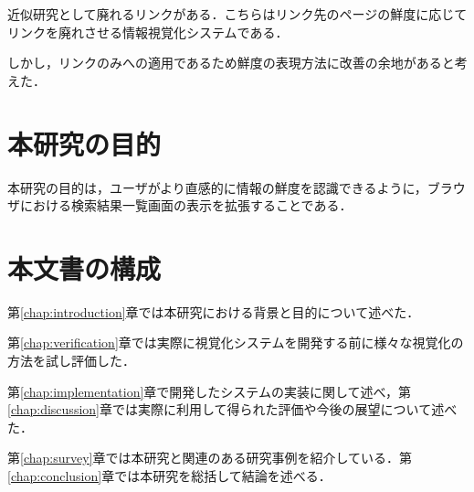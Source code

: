近似研究として廃れるリンク\cite{dyinglink}がある．こちらはリンク先のページの鮮度に応じてリンクを廃れさせる情報視覚化システムである．

しかし，リンクのみへの適用であるため鮮度の表現方法に改善の余地があると考えた．

\section{本研究の目的}

本研究の目的は，ユーザがより直感的に情報の鮮度を認識できるように，ブラウザにおける検索結果一覧画面の表示を拡張することである．

\section{本文書の構成}

第\ref{chap:introduction}章では本研究における背景と目的について述べた．

第\ref{chap:verification}章では実際に視覚化システムを開発する前に様々な視覚化の方法を試し評価した．

第\ref{chap:implementation}章で開発したシステムの実装に関して述べ，第\ref{chap:discussion}章では実際に利用して得られた評価や今後の展望について述べた．

第\ref{chap:survey}章では本研究と関連のある研究事例を紹介している．第\ref{chap:conclusion}章では本研究を総括して結論を述べる．
